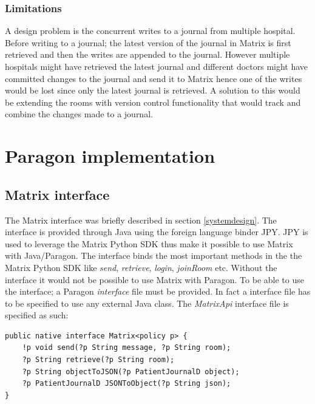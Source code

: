 \subsubsection{Limitations} \label{concurrentwrites}



A design problem is the concurrent writes to a journal from multiple hospital. Before writing to a journal; the latest version of the journal in Matrix is first retrieved and then the writes are appended to the journal. However multiple hospitals might have retrieved the latest journal and different doctors might have committed changes to the journal and send it to Matrix hence one of the writes would be lost since only the latest journal is retrieved. A solution to this would be extending the rooms with version control functionality that would track and combine the changes made to a journal.



\section{Paragon implementation}

\subsection{Matrix interface}

The Matrix interface was briefly described in section \ref{systemdesign}. The interface is provided through Java using the foreign language binder JPY. JPY is used to leverage the Matrix Python SDK thus make it possible to use Matrix with Java/Paragon. The interface binds the most important methods in the the Matrix Python SDK like \emph{send}, \emph{retrieve}, \emph{login}, \emph{joinRoom} etc. Without the interface it would not be possible to use Matrix with Paragon. To be able to use the interface; a Paragon \emph{interface} file must be provided. In fact a interface file has to be specified to use any external Java class. The \emph{MatrixApi} interface file is specified as such:

\begin{lstlisting}
public native interface Matrix<policy p> {
	!p void send(?p String message, ?p String room);
	?p String retrieve(?p String room);
	?p String objectToJSON(?p PatientJournalD object);
	?p PatientJournalD JSONToObject(?p String json);
}
\end{lstlisting}

